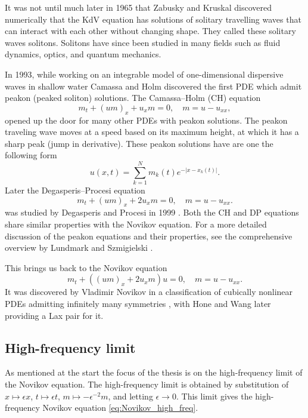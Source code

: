 \documentclass[english,master]{liumaiex}
\theoremstyle{plain}
\theoremstyle{definition}
\begin{document}
It was not until much later in 1965 that Zabusky and Kruskal \cite{Zabusky1965} discovered numerically that the KdV equation has solutions of solitary travelling waves that can interact with each other without changing shape. They called these solitary waves solitons. Solitons have since been studied in many fields such as fluid dynamics, optics, and quantum mechanics.

In 1993\cite{Camassa_1993}, while working on an integrable model of one-dimensional dispersive waves in shallow water Camassa and Holm discovered the first PDE which admit peakon (peaked soliton) solutions. The Camassa--Holm (CH) equation
\begin{equation} \label{eq:CH}
	m_t + (um)_x + u_xm = 0,\quad m = u - u_{xx},
\end{equation}
opened up the door for many other PDEs with peakon solutions. The peakon traveling wave moves at a speed based on its maximum height, at which
it has a sharp peak (jump in derivative). These peakon solutions have are one the following form
\begin{equation} \label{eq:peakon}
	u(x, t) = \sum_{k = 1}^{N} m_k(t) e^{-|x - x_k(t)|}.
\end{equation}
Later the Degasperis--Procesi equation
\begin{equation} \label{eq:DP}
	m_t + (um)_x + 2u_xm = 0,\quad m = u - u_{xx}.
\end{equation}
was studied by Degasperis and Procesi in 1999 \cite{Degasperis_1999}. Both the CH and DP equations share similar properties with the Novikov equation. For a more detailed discussion of the peakon equations and their properties, see the comprehensive overview by Lundmark and Szmigielski \cite{Lundmark_2022}.

This brings us back to the Novikov equation
\begin{equation} \label{eq:Novikov_high_freq}
	m_t + ((um)_x + 2u_xm) u = 0,\quad m = u - u_{xx}.
\end{equation}
It was discovered by Vladimir Novikov in a classification of cubically nonlinear PDEs admitting infinitely many symmetries \cite{Novikov_2009}, with Hone and Wang \cite{Hone2008} later providing a Lax pair for it.

\subsection{High-frequency limit}

As mentioned at the start the focus of the thesis is on the high-frequency limit of the Novikov equation. The high-frequency limit is obtained by substitution of $x \mapsto \epsilon x$, $t \mapsto \epsilon t$, $m \mapsto -\epsilon^{-2} m$, and letting $\epsilon \rightarrow 0$. This limit gives the high-frequency Novikov equation \eqref{eq:Novikov_high_freq}.
\end{document}
